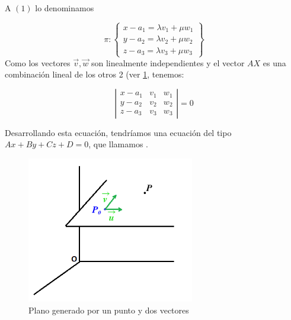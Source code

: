  A $(1)$ lo denominamos 

\[
\pi:\displaystyle \left\{
\begin{array}{c} 
x - a_1 = \lambda v_1 + \mu w_1\\
y - a_2 = \lambda v_2 + \mu w_2 \\ 
z - a_3 = \lambda v_3 + \mu w_3 
\end{array}\right\}
\]
Como los vectores $\vec{v},\vec{w}$ son linealmente independientes y el vector $AX$ es una combinación lineal de los otros 2 (ver \ref{fig:plano}, tenemos:

\[
\left|
\begin{array}{ccc} 
x - a_1 & v_1 & w_1\\
y - a_2 & v_2 & w_2 \\ 
z - a_3 & v_3 & w_3 
\end{array}\right| = 0
\]

Desarrollando esta ecuación, tendríamos una ecuación del tipo $Ax+By+Cz + D = 0$, que llamamos .


\begin{figure}[hptb]
    \centering
    \includegraphics[width=0.65\textwidth]{img/ecplanos.png}
    \caption{Plano generado por un punto y dos vectores}
    \label{fig:plano}
\end{figure}

